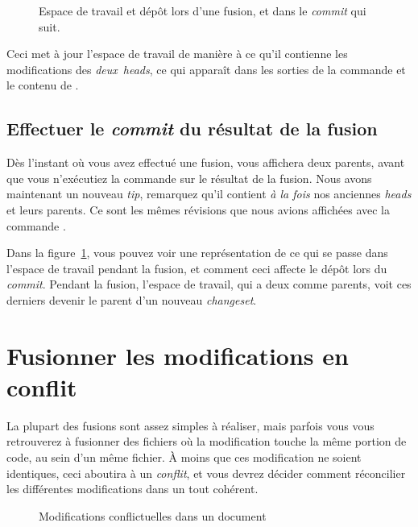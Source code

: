 \begin{figure}[ht]
  \centering
  \caption{Espace de travail et dépôt lors d'une fusion, et dans le
    \textit{commit} qui suit.}
  \label{fig:tour-merge:merge}
\end{figure}

Ceci met à jour l'espace de travail de manière à ce qu'il contienne
les modifications des \emph{deux} \textit{heads}, ce qui apparaît dans
les sorties de la commande  et le contenu de 
. 

\subsection{Effectuer le \textit{commit} du résultat de la fusion}

Dès l'instant où vous avez effectué une fusion,  vous
affichera deux parents, avant que vous n'exécutiez la commande 
 sur le résultat de la fusion.
Nous avons maintenant un nouveau \textit{tip}, remarquez qu'il contient
\emph{à la fois} nos anciennes \textit{heads} et leurs parents. Ce sont
les mêmes révisions que nous avions affichées avec la commande 
.

Dans la figure~\ref{fig:tour-merge:merge}, vous pouvez voir une représentation
de ce qui se passe dans l'espace de travail pendant la fusion, et comment ceci
affecte le dépôt lors du \textit{commit}. Pendant la fusion, l'espace de travail,
qui a deux  comme parents, voit ces derniers devenir le parent
d'un nouveau \textit{changeset}.

\section{Fusionner les modifications en conflit}

La plupart des fusions sont assez simples à réaliser, mais parfois 
vous vous retrouverez à fusionner des fichiers où la modification touche
la même portion de code, au sein d'un même fichier. À moins que ces
modification ne soient identiques, ceci aboutira à un \emph{conflit},
et vous devrez décider comment réconcilier les différentes modifications
dans un tout cohérent. 

\begin{figure}[ht]
  \centering
  \caption{Modifications conflictuelles dans un document}
  \label{fig:tour-merge:conflict}
\end{figure}

